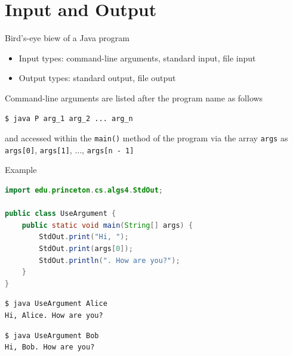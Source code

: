\documentclass[8pt,a4paper,compress]{beamer}
\begin{document}
\section{Input and Output}
\begin{frame}[fragile]
\pause

Bird's-eye biew of a Java program
\begin{center}
\end{center}

\begin{itemize}
\item Input types: command-line arguments, standard input, file input
\item Output types: standard output, file output
\end{itemize}

\pause
\bigskip

Command-line arguments are listed after the program name as follows
\begin{lstlisting}[language=bash]
$ java P arg_1 arg_2 ... arg_n
\end{lstlisting}
and accessed within the \lstinline$main()$ method of the program via the array \lstinline$args$  as \lstinline$args[0]$, \lstinline$args[1]$, $\dots$, \lstinline$args[n - 1]$

\pause
\bigskip

Example
\begin{lstlisting}[language=Java]
import edu.princeton.cs.algs4.StdOut;

public class UseArgument {
    public static void main(String[] args) {
        StdOut.print("Hi, ");
        StdOut.print(args[0]);
        StdOut.println(". How are you?");
    }
}
\end{lstlisting}

\pause

\begin{lstlisting}[language={}]
$ java UseArgument Alice
Hi, Alice. How are you?
\end{lstlisting}

\pause

\begin{lstlisting}[language={}]
$ java UseArgument Bob
Hi, Bob. How are you?
\end{lstlisting}
\end{frame}
\end{document}

